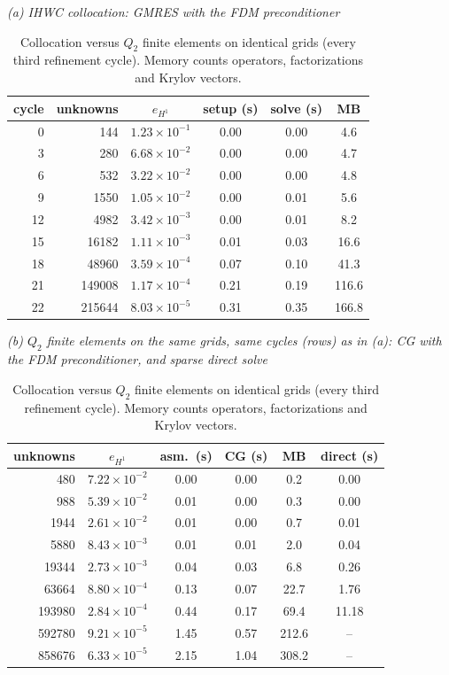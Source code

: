 \documentclass[preprint,12pt]{elsarticle}
\theoremstyle{remark}
\begin{document}
\begin{table}[t]\centering\small
\caption{Collocation versus $Q_2$ finite elements on identical grids (every third refinement cycle).
Memory counts operators, factorizations and Krylov vectors.}\label{tab:q2}
\textit{(a) IHWC collocation: GMRES with the FDM preconditioner}\\[2pt]
\begin{tabular}{rr c ccc}
\toprule
cycle & unknowns & $e_{H^1}$ & setup (s) & solve (s) & MB\\
\midrule
0 & 144 & $1.23{\times}10^{-1}$ & 0.00 & 0.00 & 4.6\\
3 & 280 & $6.68{\times}10^{-2}$ & 0.00 & 0.00 & 4.7\\
6 & 532 & $3.22{\times}10^{-2}$ & 0.00 & 0.00 & 4.8\\
9 & 1550 & $1.05{\times}10^{-2}$ & 0.00 & 0.01 & 5.6\\
12 & 4982 & $3.42{\times}10^{-3}$ & 0.00 & 0.01 & 8.2\\
15 & 16182 & $1.11{\times}10^{-3}$ & 0.01 & 0.03 & 16.6\\
18 & 48960 & $3.59{\times}10^{-4}$ & 0.07 & 0.10 & 41.3\\
21 & 149008 & $1.17{\times}10^{-4}$ & 0.21 & 0.19 & 116.6\\
22 & 215644 & $8.03{\times}10^{-5}$ & 0.31 & 0.35 & 166.8\\
\bottomrule
\end{tabular}

\medskip
\textit{(b) $Q_2$ finite elements on the same grids, same cycles (rows) as in (a): CG with the FDM preconditioner, and sparse direct solve}\\[2pt]
\begin{tabular}{r c cccc}
\toprule
unknowns & $e_{H^1}$ & asm.\ (s) & CG (s) & MB & direct (s)\\
\midrule
480 & $7.22{\times}10^{-2}$ & 0.00 & 0.00 & 0.2 & 0.00\\
988 & $5.39{\times}10^{-2}$ & 0.01 & 0.00 & 0.3 & 0.00\\
1944 & $2.61{\times}10^{-2}$ & 0.01 & 0.00 & 0.7 & 0.01\\
5880 & $8.43{\times}10^{-3}$ & 0.01 & 0.01 & 2.0 & 0.04\\
19344 & $2.73{\times}10^{-3}$ & 0.04 & 0.03 & 6.8 & 0.26\\
63664 & $8.80{\times}10^{-4}$ & 0.13 & 0.07 & 22.7 & 1.76\\
193980 & $2.84{\times}10^{-4}$ & 0.44 & 0.17 & 69.4 & 11.18\\
592780 & $9.21{\times}10^{-5}$ & 1.45 & 0.57 & 212.6 & --\\
858676 & $6.33{\times}10^{-5}$ & 2.15 & 1.04 & 308.2 & --\\
\bottomrule
\end{tabular}
\end{table}
\end{document}
